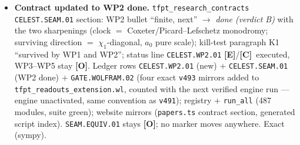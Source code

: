 \documentclass[11pt]{article}
\providecommand{\mE}{\textbf{[E]}}\providecommand{\mC}{\textbf{[C]}}
\providecommand{\mO}{\textbf{[O]}}\providecommand{\mX}{\textbf{[X]}}
\begin{document}
\begin{itemize}[leftmargin=1.5em]
$\Z_4$ wrap, conserving the $\mu_4$ grade --- no sector leak, the \texttt{v492} equivariant sector deforms
consistently; $a_0\leftrightarrow$ BHS's weight-$0$ $c^2$ slot; matrix factorisations deform along all orbit
splittings, the clock fixing exactly the antipodal $2{+}2$ sector ($=$ the EH/$\Z_2$ middle node,
$4{=}2{\times}2$). \emph{Negative controls:} $a_1Z\Rightarrow j{=}0$ (hexagonal); pure $a_2Z^2$ stays
singular ($A_1$); $a_2{\neq}0\Rightarrow j{=}1556068/81{\neq}1728$; explicit grading leak --- doubly sharp.
\emph{Verdict B} via three named \mC\ identifications ($-4$Nambu $=$ the $k{=}4$ CCA bracket; period $=$
root difference; seam-scale reading via clock$^2{=}$deck); the \texttt{v216} residual is \emph{typed}, not
moved (given the order-$4$ clock the square is automatic --- a relocation of the same input, no new
derivation).
\item \textbf{Contract updated to WP2 done.} \texttt{tfpt\_research\_contracts} \texttt{CELEST.SEAM.01}
section: WP2 bullet ``finite, next'' $\to$ \emph{done (verdict B)} with the two sharpenings (clock $=$
Coxeter/Picard--Lefschetz monodromy; surviving direction $=$ $\chi_1$-diagonal, $a_0$ pure scale);
kill-test paragraph K1 ``survived by WP1 and WP2''; status line \texttt{CELEST.WP2.01} \mE/\mC\ executed,
WP3--WP5 stay \mO. Ledger rows \texttt{CELEST.WP2.01} (new) $+$ \texttt{CELEST.SEAM.01} (WP2 done) $+$
\texttt{GATE.WOLFRAM.02} (four exact \texttt{v493} mirrors added to
\texttt{tfpt\_readouts\_extension.wl}, counted with the next verified engine run --- engine unactivated,
same convention as \texttt{v491}); registry $+$ \texttt{run\_all} (487 modules, suite green); website mirrors
(\texttt{papers.ts} contract section, generated script index). \texttt{SEAM.EQUIV.01} stays \mO; no marker
moves anywhere. Exact (sympy).
\end{itemize}
\end{document}
